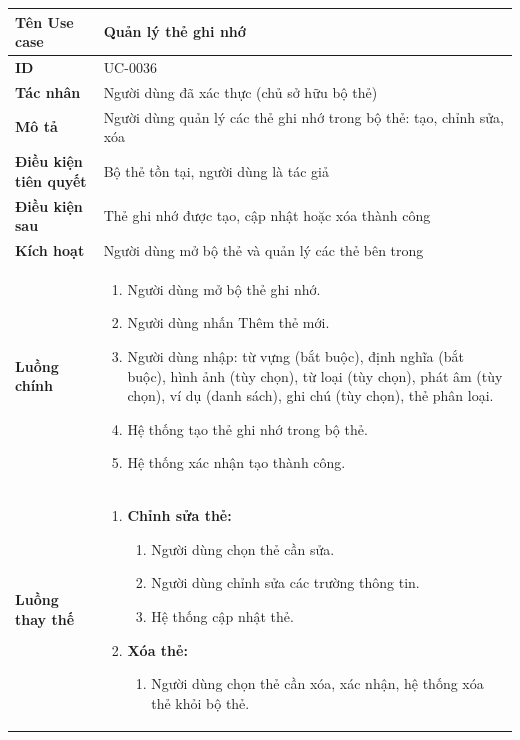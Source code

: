 {
\renewcommand{\arraystretch}{1.5}

\begin{tabularx}{\textwidth}{|>{\raggedright\arraybackslash}X|>{\raggedright\arraybackslash}X|}
\hline
\textbf{Tên Use case} & Quản lý thẻ ghi nhớ \\
\hline
\textbf{ID} & UC-0036 \\
\hline
\textbf{Tác nhân} & Người dùng đã xác thực (chủ sở hữu bộ thẻ) \\
\hline
\textbf{Mô tả} & Người dùng quản lý các thẻ ghi nhớ trong bộ thẻ: tạo, chỉnh sửa, xóa \\
\hline
\textbf{Điều kiện tiên quyết} & Bộ thẻ tồn tại, người dùng là tác giả \\
\hline
\textbf{Điều kiện sau} & Thẻ ghi nhớ được tạo, cập nhật hoặc xóa thành công \\
\hline
\textbf{Kích hoạt} & Người dùng mở bộ thẻ và quản lý các thẻ bên trong \\
\hline
\textbf{Luồng chính} &
\begin{enumerate}
    \item Người dùng mở bộ thẻ ghi nhớ.
    \item Người dùng nhấn Thêm thẻ mới.
    \item Người dùng nhập: từ vựng (bắt buộc), định nghĩa (bắt buộc), hình ảnh (tùy chọn), từ loại (tùy chọn), phát âm (tùy chọn), ví dụ (danh sách), ghi chú (tùy chọn), thẻ phân loại.
    \item Hệ thống tạo thẻ ghi nhớ trong bộ thẻ.
    \item Hệ thống xác nhận tạo thành công.
\end{enumerate} \\
\hline
\textbf{Luồng thay thế} &
\begin{enumerate}
    \item \textbf{Chỉnh sửa thẻ:}
    \begin{enumerate}
        \item[2A.] Người dùng chọn thẻ cần sửa.
        \item[3A.] Người dùng chỉnh sửa các trường thông tin.
        \item[4A.] Hệ thống cập nhật thẻ.
    \end{enumerate}
    \item \textbf{Xóa thẻ:}
    \begin{enumerate}
        \item[2B.] Người dùng chọn thẻ cần xóa, xác nhận, hệ thống xóa thẻ khỏi bộ thẻ.

\end{enumerate}
\end{enumerate}
\end{tabularx}}
